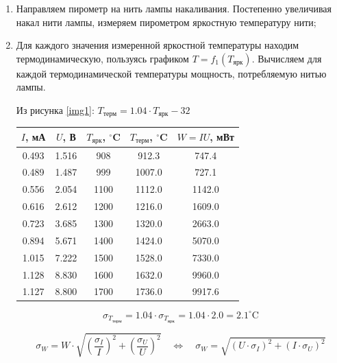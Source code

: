 \documentclass[a4paper,12pt]{article}
\begin{document}
\begin{enumerate}
    \item Направляем пирометр на нить лампы накаливания. Постепенно увеличивая накал нити лампы, измеряем пирометром яркостную температуру нити;
    \item Для каждого значения измеренной яркостной температуры находим термодинамическую, пользуясь графиком $T=f_1(T_\text{ярк})$. Вычисляем для каждой термодинамической температуры мощность, потребляемую нитью лампы.

    Из рисунка \ref{img1}: $T_{\text{терм}} = 1.04 \cdot T_{\text{ярк}} - 32$
    
    \begin{table}[h!]
    \centering
    \begin{tabular}{||c|c|c|c|c||}
    \hline
    $I$, мА & $U$, В & $T_{\text{ярк}}$, $^\circ$C & $T_{\text{терм}}$, $^\circ$C & $W=IU$, мВт \\
    \hline
    \hline
    0.493 & 1.516 & 908 & 912.3 & 747.4 \\
    0.489 & 1.487 & 999 & 1007.0 & 727.1 \\
    0.556 & 2.054 & 1100 & 1112.0 & 1142.0 \\
    0.616 & 2.612 & 1200 & 1216.0 & 1609.0 \\
    0.723 & 3.685 & 1300 & 1320.0 & 2663.0 \\
    0.894 & 5.671 & 1400 & 1424.0 & 5070.0 \\
    1.015 & 7.222 & 1500 & 1528.0 & 7330.0 \\
    1.128 & 8.830 & 1600 & 1632.0 & 9960.0 \\
    1.127 & 8.800 & 1700 & 1736.0 & 9917.6 \\
    \hline
    \end{tabular}
    \end{table}
    $$
    \sigma_{T_{\text{терм}}} = 1.04 \cdot \sigma_{T_{\text{ярк}}} = 1.04 \cdot 2.0 = 2.1^\circ \text{C}
    $$

    $$
    \sigma_W = W \cdot \sqrt{\left(\frac{\sigma_I}{I}\right)^2 + \left(\frac{\sigma_U}{U}\right)^2}\quad \Longleftrightarrow \quad \sigma_W = \sqrt{(U \cdot \sigma_I)^2 + (I \cdot \sigma_U)^2}
    $$


\end{enumerate}
\end{document}
